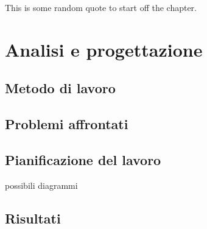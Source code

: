 \begin{savequote}[75mm]
This is some random quote to start off the chapter.
\end{savequote}

\chapter{Analisi e progettazione}

\section{Metodo di lavoro}
\section{Problemi affrontati}
\section{Pianificazione del lavoro}
possibili diagrammi
\section{Risultati}



